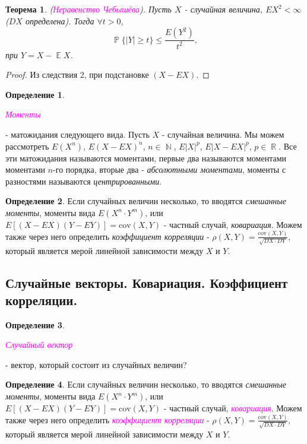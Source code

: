 \documentclass[a4paper,100pt]{article}
\theoremstyle{indented}
\newtheorem{theorem}{Теорема}
\theoremstyle{definition}
\newtheorem{defn}{Определение}
\theoremstyle{remark}
\DeclareMathOperator{\RR}{\mathbb{R}}
\DeclareMathOperator{\NN}{\mathbb{N}}
\DeclareMathOperator{\PP}{\mathbb{P}}
\DeclareMathOperator{\EE}{\mathbb{E}}
\begin{document}
\begin{theorem}
  (\hypertarget{n16}{\textcolor{magenta}{\textit{Неравенство Чебышёва}}}). Пусть $X$ - случайная величина, $EX^2<\infty$ ($DX$ определена). Тогда $\forall t >0$, 
  \[
      \PP\{|Y|\geq t\}\leq \frac{E(Y^2)}{t^2},
  \]
  при $Y=X-\EE X$.
\end{theorem}

\begin{proof}
  Из следствия 2, при подстановке $(X-EX)$. 
\end{proof}

\begin{defn}
  \hypertarget{n17}{\textcolor{magenta}{\textit{Моменты}}} - матожидания следующего вида. Пусть $X$ - случайная величина. Мы можем рассмотреть $E(X^n)$, $E(X-EX)^n$, $n\in \NN$, $E|X|^p$, $E|X-EX|^p$, $p\in \RR$. Все эти матожидания называются моментами, первые два называются моментами моментами $n$-го порядка, вторые два - \textit{абсолютными моментами}, моменты с разностями называются \textit{центрированными}.  
\end{defn}

\begin{defn}
  Если случайных величин несколько, то вводятся \textit{смешанные моменты}, моменты вида $E(X^n\cdot Y^m)$, или $E[(X-EX)(Y-EY)]=\text{cov}(X, Y)$ - частный случай, \textit{ковариация}. Можем также через него определить \textit{коэффициент корреляции} - $\rho(X, Y)=\frac{\text{cov}(X, Y)}{\sqrt{DX\cdot DY}}$, который является мерой линейной зависимости между $X$ и $Y$. 
\end{defn}

\subsection{Случайные векторы. Ковариация. Коэффициент корреляции.} 

\begin{defn}
  \hypertarget{n18}{\textcolor{magenta}{\textit{Случайный вектор}}} - вектор, который состоит из случайных величин?
\end{defn}

\begin{defn}
  Если случайных величин несколько, то вводятся \textit{смешанные моменты}, моменты вида $E(X^n\cdot Y^m)$, или $E[(X-EX)(Y-EY)]=\text{cov}(X, Y)$ - частный случай, \hypertarget{n19}{\textcolor{magenta}{\textit{ковариация}}}. Можем также через него определить \hypertarget{n20}{\textcolor{magenta}{\textit{коэффициент корреляции}}} - $\rho(X, Y)=\frac{\text{cov}(X, Y)}{\sqrt{DX\cdot DY}}$, который является мерой линейной зависимости между $X$ и $Y$. 
\end{defn}
\end{document}
